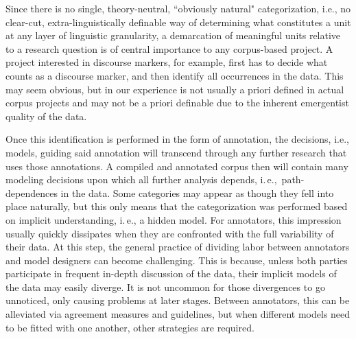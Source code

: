 \documentclass[output=paper,colorlinks,citecolor=brown]{langscibook}
\begin{document}
Since there is no single, theory-neutral, ``obviously natural" categorization, i.e., no clear-cut, extra-linguistically definable way of determining what constitutes a unit at any layer of linguistic granularity, a demarcation of meaningful units relative to a research question is of central importance to any corpus-based project. A project interested in discourse markers, for example, first has to decide what counts as a discourse marker, and then identify all occurrences in the data. This may seem obvious, but in our experience is not usually a priori defined in actual corpus projects and may not be a priori definable due to the inherent emergentist quality of the data. 

Once this identification is performed in the form of annotation, the decisions, i.e., models, guiding said annotation will transcend through any further research that uses those annotations. A compiled and annotated corpus then will contain many modeling decisions upon which all further analysis depends, i.\,e.,\ path-dependences in the data. Some categories may appear as though they fell into place naturally, but this only means that the categorization was performed based on implicit understanding, i.\,e., a hidden model. For annotators, this impression usually quickly dissipates when they are confronted with the full variability of their data. At this step, the general practice of dividing labor between annotators and model designers can become challenging. This is because, unless both parties participate in frequent in-depth discussion of the data, their implicit models of the data may easily diverge. It is not uncommon for those divergences to go unnoticed, only causing problems at later stages. Between annotators, this can be alleviated via agreement measures and guidelines, but when different models need to be fitted with one another, other strategies are required.
\end{document}
